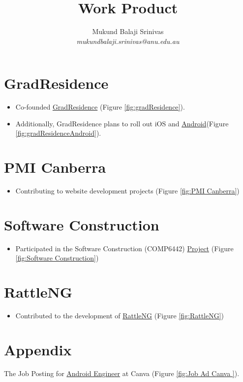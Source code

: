\documentclass{article}
\title{Work Product}
\author{Mukund Balaji Srinivas\\\textit{mukundbalaji.srinivas@anu.edu.au}}
\begin{document}
\maketitle

\section*{GradResidence}
\begin{itemize}
    \item Co-founded \href{https://gradresidence.com/}{GradResidence} (Figure \ref{fig:gradResidence}).
    \item Additionally, GradResidence plans to roll out iOS and \href{https://github.com/gradresidence/android}{Android}(Figure \ref{fig:gradResidenceAndroid}).
\end{itemize}

\section*{PMI Canberra}
\begin{itemize}
    \item Contributing to website development projects (Figure \ref{fig:PMI Canberra})
\end{itemize}

\section*{Software Construction}
\begin{itemize}
    \item Participated in the Software Construction (COMP6442) \href{https://gitlab.cecs.anu.edu.au/u7544253/ga-23s1-comp2100-6442} {Project} (Figure \ref{fig:Software Construction})
\end{itemize}

\section*{RattleNG}
\begin{itemize}
    \item Contributed to the development of \href{https://github.com/gjwgit/rattleng}{RattleNG} (Figure \ref{fig:RattleNG})
\end{itemize}


\section*{Appendix}
The Job Posting for \href{https://www.lifeatcanva.com/en/jobs/743999989773993/android-engineer/}{Android Engineer} at Canva (Figure \ref{fig:Job Ad Canva }).
\end{document}
